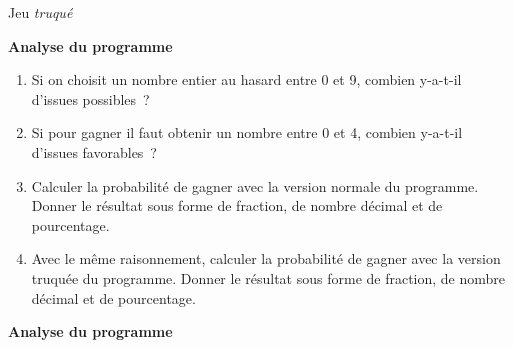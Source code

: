 \begin{eleve}
\begin{minipage}[t]{0.5\linewidth}
\begin{center}
        Jeu \emph{truqué}
    \end{center}
\end{minipage}
    
    \textbf{Analyse du programme}
    
    \begin{enumerate}
        \item   Si on choisit un nombre entier au hasard entre 0 et 9, combien y-a-t-il d’issues possibles ?
        \item Si pour gagner il faut obtenir un nombre entre 0 et 4, combien y-a-t-il d’issues favorables ?  
        \item Calculer la probabilité de gagner avec la version normale du programme. Donner le résultat sous forme de fraction, de nombre décimal et de pourcentage.
        \item Avec le même raisonnement, calculer la probabilité de gagner avec la version truquée du programme. Donner le résultat sous forme de fraction, de nombre décimal et de pourcentage.
    \end{enumerate}
    
    \newpage
    \textbf{Analyse du programme}
    

\end{eleve}
